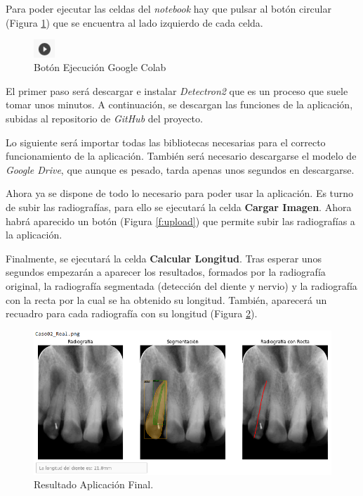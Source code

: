 Para poder ejecutar las celdas del \emph{notebook} hay que pulsar al botón circular (Figura \ref{f:play}) que se encuentra al lado izquierdo de cada celda.

\begin{figure}[h]
 \centering
  \includegraphics[width=0.07\textwidth]{img/Play.PNG}
 \caption{Botón Ejecución Google Colab}
 \label{f:play}
\end{figure}

El primer paso será descargar e instalar \emph{Detectron2} que es un proceso que suele tomar unos minutos. A continuación, se descargan las funciones de la aplicación, subidas al repositorio de \emph{GitHub} del proyecto.

Lo siguiente será importar todas las bibliotecas necesarias para el correcto funcionamiento de la aplicación. También será necesario descargarse el modelo de \emph{Google Drive}, que aunque es pesado, tarda apenas unos segundos en descargarse.

Ahora ya se dispone de todo lo necesario para poder usar la aplicación. Es turno de subir las radiografías, para ello se ejecutará la celda \textbf{Cargar Imagen}. Ahora habrá aparecido un botón (Figura \ref{f:upload}) que permite subir las radiografías a la aplicación.

Finalmente, se ejecutará la celda \textbf{Calcular Longitud}. Tras esperar unos segundos empezarán a aparecer los resultados, formados por la radiografía original, la radiografía segmentada (detección del diente y nervio) y la radiografía con la recta por la cual se ha obtenido su longitud. También, aparecerá un recuadro para cada radiografía con su longitud (Figura \ref{apli}).

\begin{figure}[h]
    \centering
    \includegraphics[scale=0.6]{./img/ResultadoApl.png}
    \caption{Resultado Aplicación Final.}
    \label{apli}
\end{figure}

